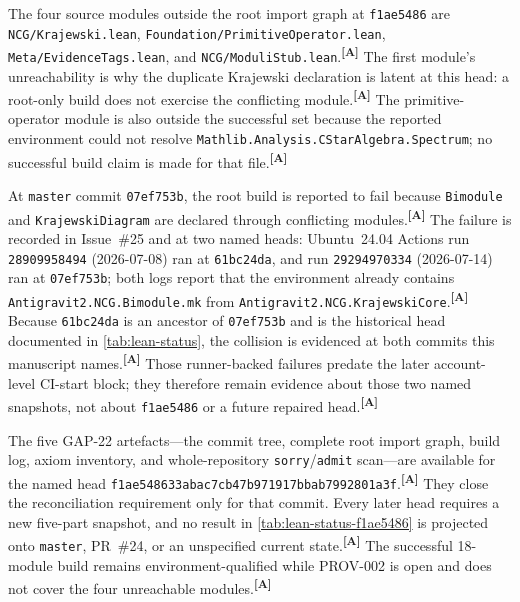 \documentclass[12pt,a4paper,twoside]{article}
\theoremstyle{plain}
\theoremstyle{definition}
\theoremstyle{remark}
\newcommand{\catmark}[1]{\textsuperscript{\textsf{\textbf{[#1]}}}}
\begin{document}
\begin{governancebox}
The four source modules outside the root import graph at
\texttt{f1ae5486} are \texttt{NCG/Krajewski.lean},
\texttt{Foundation/PrimitiveOperator.lean},
\texttt{Meta/EvidenceTags.lean}, and \texttt{NCG/ModuliStub.lean}.\catmark{A}
The first module's unreachability is why the duplicate Krajewski declaration
is latent at this head: a root-only build does not exercise the conflicting
module.\catmark{A}
The primitive-operator module is also outside the successful set because the
reported environment could not resolve
\texttt{Mathlib.Analysis.CStarAlgebra.Spectrum}; no successful build claim is
made for that file.\catmark{A}
\end{governancebox}

\begin{governancebox}
At \texttt{master} commit \texttt{07ef753b}, the root build is reported to
fail because \texttt{Bimodule} and \texttt{KrajewskiDiagram} are declared
through conflicting modules.\catmark{A}
The failure is recorded in Issue~\#25 and at two named heads: Ubuntu~24.04
Actions run \texttt{28909958494} (2026-07-08) ran at \texttt{61bc24da}, and
run \texttt{29294970334} (2026-07-14) ran at \texttt{07ef753b}; both logs
report that the environment already contains
\texttt{Antigravit2.NCG.Bimodule.mk} from
\texttt{Antigravit2.NCG.KrajewskiCore}.\catmark{A}
Because \texttt{61bc24da} is an ancestor of \texttt{07ef753b} and is the
historical head documented in \cref{tab:lean-status}, the collision is
evidenced at both commits this manuscript names.\catmark{A}
Those runner-backed failures predate the later account-level CI-start block;
they therefore remain evidence about those two named snapshots,
not about \texttt{f1ae5486} or a future repaired head.\catmark{A}
\end{governancebox}

\begin{governancebox}
The five GAP-22 artefacts---the commit tree, complete root import graph,
build log, axiom inventory, and whole-repository
\texttt{sorry}/\texttt{admit} scan---are available for the named head
\texttt{f1ae548633abac7cb47b971917bbab7992801a3f}.\catmark{A}
They close the reconciliation requirement only for that commit. Every later
head requires a new five-part snapshot, and no result in
\cref{tab:lean-status-f1ae5486} is projected onto \texttt{master}, PR~\#24,
or an unspecified current state.\catmark{A}
The successful 18-module build remains environment-qualified while PROV-002
is open and does not cover the four unreachable modules.\catmark{A}
\end{governancebox}
\end{document}
